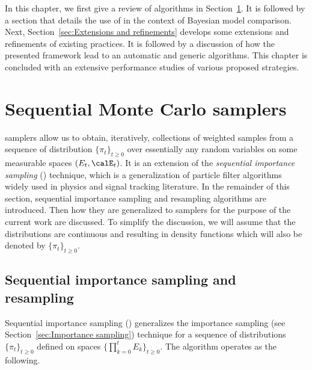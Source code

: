 In this chapter, we first give a review of \smc algorithms in
Section~\ref{sec:Sequential Monte Carlo samplers}. It is followed by a section
that details the use of \smc in the context of Bayesian model comparison.
Next, Section~\ref{sec:Extensions and refinements} develops some extensions
and refinements of existing practices. It is followed by a discussion of how
the presented framework lead to an automatic and generic algorithms. This
chapter is concluded with an extensive performance studies of various proposed
strategies.

\section{Sequential Monte Carlo samplers}
\label{sec:Sequential Monte Carlo samplers}

\smc samplers allow us to obtain, iteratively, collections of weighted samples
from a sequence of distribution $\{\pi_t\}_{t\ge0}$ over essentially any
random variables on some measurable spaces $(E_t,\calE_t)$. It is an extension
of the \emph{sequential importance sampling} (\sis) technique, which is a
generalization of particle filter algorithms widely used in physics and signal
tracking literature. In the remainder of this section, sequential importance
sampling and resampling algorithms are introduced. Then how they are
generalized to \smc samplers for the purpose of the current work are
discussed. To simplify the discussion, we will assume that the distributions
are continuous and resulting in density functions which will also be denoted
by $\{\pi_t\}_{t\ge0}$.

\subsection{Sequential importance sampling and resampling}
\label{sub:Sequential importance sampling and resampling}

Sequential importance sampling (\sis) generalizes the importance sampling (see
Section~\ref{sec:Importance sampling}) technique for a sequence of
distributions $\{\pi_t\}_{t\ge0}$ defined on spaces
$\{\prod_{k=0}^tE_k\}_{t\ge0}$. The algorithm operates as the following.

